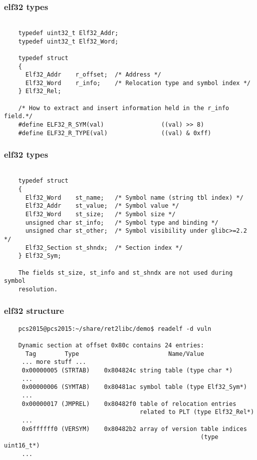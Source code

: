 \documentclass[10pt]{beamer}
\begin{document}
\begin{frame}[fragile]
\frametitle{elf32 types}

	\footnotesize
	\begin{verbatim}

	typedef uint32_t Elf32_Addr;
	typedef uint32_t Elf32_Word;

	typedef struct
	{
	  Elf32_Addr    r_offset;  /* Address */
	  Elf32_Word    r_info;    /* Relocation type and symbol index */
	} Elf32_Rel;

	/* How to extract and insert information held in the r_info field.*/
	#define ELF32_R_SYM(val)                ((val) >> 8)
	#define ELF32_R_TYPE(val)               ((val) & 0xff)
	\end{verbatim}
	\normalsize

\end{frame}

\begin{frame}[fragile]
\frametitle{elf32 types}

	\footnotesize
	\begin{verbatim}

	typedef struct
	{
	  Elf32_Word    st_name;   /* Symbol name (string tbl index) */
	  Elf32_Addr    st_value;  /* Symbol value */
	  Elf32_Word    st_size;   /* Symbol size */
	  unsigned char st_info;   /* Symbol type and binding */
	  unsigned char st_other;  /* Symbol visibility under glibc>=2.2 */
	  Elf32_Section st_shndx;  /* Section index */
	} Elf32_Sym;

	The fields st_size, st_info and st_shndx are not used during symbol
	resolution.
	\end{verbatim}
	\normalsize

\end{frame}

\begin{frame}[fragile]
\frametitle{elf32 structure}

	\scriptsize
	\begin{verbatim}
	pcs2015@pcs2015:~/share/ret2libc/demo$ readelf -d vuln

	Dynamic section at offset 0x80c contains 24 entries:
	  Tag        Type                         Name/Value
	 ... more stuff ...
	 0x00000005 (STRTAB)    0x804824c string table (type char *)
	 ...
	 0x00000006 (SYMTAB)    0x80481ac symbol table (type Elf32_Sym*)
	 ...
	 0x00000017 (JMPREL)    0x80482f0 table of relocation entries
	                                  related to PLT (type Elf32_Rel*)
	 ...
	 0x6ffffff0 (VERSYM)    0x80482b2 array of version table indices
	                                                   (type uint16_t*)
	 ...
	\end{verbatim}
	\normalsize

\end{frame}
\end{document}
